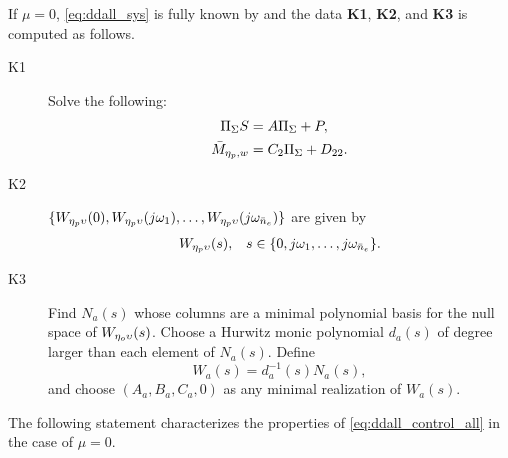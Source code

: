 \begin{remark}[\textbf{K1}, \textbf{K2}, \textbf{K3} for $\mu=0$]
  \label{rem:ddall_nominalK123}
  If $\mu=0$, \eqref{eq:ddall_sys} is fully known by  and the data \textbf{K1}, \textbf{K2}, and \textbf{K3} is computed as follows.
  \begin{description}
    \item[K1] Solve the following:
      \begin{subequations}
        \label{eq:ddall_Mbar_complete}
        \begin{align}
          \Pi_{\Sigma}S &= A\Pi_{\Sigma} + P,\label{eq:ddall_Mbar_completea} \\
          \bar{M}_{\eta_p,w} &= C_2\Pi_{\Sigma} + D_{22}.\label{eq:ddall_Mbar}
        \end{align}
      \end{subequations}
    \item[K2] $\{W_{\eta_p\upsilon}(0), W_{\eta_p\upsilon}(j\omega_1), \dotsc, W_{\eta_p\upsilon}(j\omega_{\bar{n}_e})\}$ are given by
      \begin{align}
        W_{\eta_p\upsilon}(s), && s\in\{0,j\omega_1,\ldots,j\omega_{\bar{n}_e}\}.
      \end{align}
    \item[K3] Find $N_a(s)$ whose columns are a minimal polynomial basis for the null space of $W_{\eta_o\upsilon}(s)$. Choose a Hurwitz monic polynomial $d_a(s)$ of degree larger than each element of $N_a(s)$. Define
    \begin{equation}
      \label{eq:ddall_Wa}
      W_a(s) = d_a^{-1}(s)N_a(s),
    \end{equation}
    and choose $(A_a,B_a,C_a,0)$ as any minimal realization of $W_a(s)$.\closeremark
  \end{description}
\end{remark}

The following statement characterizes the properties of \eqref{eq:ddall_control_all} in the case of $\mu=0$.

